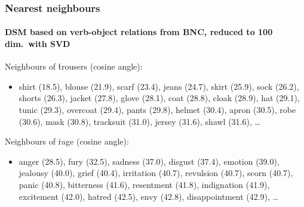 \documentclass[t]{beamer} %
\begin{document}
\begin{frame}
  \frametitle{Nearest neighbours}
  \framesubtitle{DSM based on verb-object relations from BNC, reduced to 100 dim.\ with SVD}

  Neighbours of \h{trousers} (cosine angle):
  \begin{itemize}\item[\hand]
    shirt (18.5), blouse (21.9), scarf (23.4), jeans (24.7), skirt (25.9),
    sock (26.2), shorts (26.3), jacket (27.8), glove (28.1), coat (28.8),
    cloak (28.9), hat (29.1), tunic (29.3), overcoat (29.4), pants (29.8),
    helmet (30.4), apron (30.5), robe (30.6), mask (30.8), tracksuit (31.0),
    jersey (31.6), shawl (31.6), \ldots
  \end{itemize}

  \gap\pause
  Neighbours of \h{rage} (cosine angle):
  \begin{itemize}\item[\hand]
    anger (28.5), fury (32.5), sadness (37.0), disgust (37.4), emotion (39.0),
    jealousy (40.0), grief (40.4), irritation (40.7), revulsion (40.7), scorn
    (40.7), panic (40.8), bitterness (41.6), resentment (41.8), indignation
    (41.9), excitement (42.0), hatred (42.5), envy (42.8), disappointment
    (42.9), \ldots 
  \end{itemize}
\end{frame}
\end{document}
